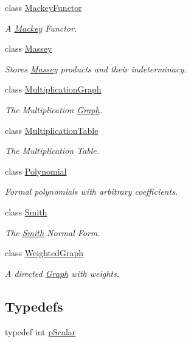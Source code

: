 \begin{DoxyCompactItemize}
class \hyperlink{classMackey_1_1MackeyFunctor}{Mackey\+Functor}
\begin{DoxyCompactList}\small\item\em A \hyperlink{namespaceMackey}{Mackey} Functor. \end{DoxyCompactList}\item 
class \hyperlink{classMackey_1_1Massey}{Massey}
\begin{DoxyCompactList}\small\item\em Stores \hyperlink{classMackey_1_1Massey}{Massey} products and their indeterminacy. \end{DoxyCompactList}\item 
class \hyperlink{classMackey_1_1MultiplicationGraph}{Multiplication\+Graph}
\begin{DoxyCompactList}\small\item\em The Multiplication \hyperlink{classMackey_1_1Graph}{Graph}. \end{DoxyCompactList}\item 
class \hyperlink{classMackey_1_1MultiplicationTable}{Multiplication\+Table}
\begin{DoxyCompactList}\small\item\em The Multiplication Table. \end{DoxyCompactList}\item 
class \hyperlink{classMackey_1_1Polynomial}{Polynomial}
\begin{DoxyCompactList}\small\item\em Formal polynomials with arbitrary coefficients. \end{DoxyCompactList}\item 
class \hyperlink{classMackey_1_1Smith}{Smith}
\begin{DoxyCompactList}\small\item\em The \hyperlink{classMackey_1_1Smith}{Smith} Normal Form. \end{DoxyCompactList}\item 
class \hyperlink{classMackey_1_1WeightedGraph}{Weighted\+Graph}
\begin{DoxyCompactList}\small\item\em A directed \hyperlink{classMackey_1_1Graph}{Graph} with weights. \end{DoxyCompactList}\end{DoxyCompactItemize}
\subsection*{Typedefs}
\begin{DoxyCompactItemize}
\item 
typedef int \hyperlink{namespaceMackey_a4f147e328c520f568f5d3adf1c75f514}{p\+Scalar}
\end{DoxyCompactItemize}
